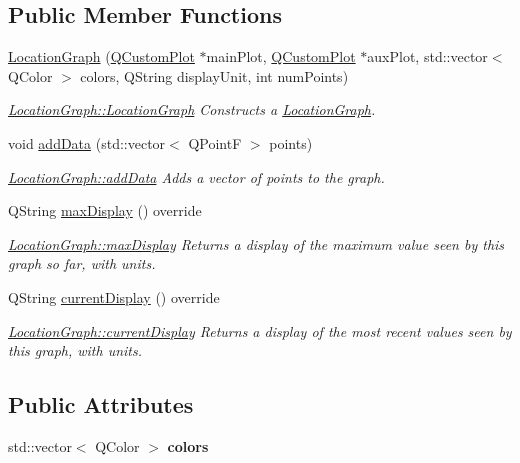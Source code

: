 \subsection*{Public Member Functions}
\begin{DoxyCompactItemize}
\item 
\hyperlink{class_location_graph_aabdd9cf30c4ff8bc2e522aab71f4f094}{Location\+Graph} (\hyperlink{class_q_custom_plot}{Q\+Custom\+Plot} $\ast$main\+Plot, \hyperlink{class_q_custom_plot}{Q\+Custom\+Plot} $\ast$aux\+Plot, std\+::vector$<$ Q\+Color $>$ colors, Q\+String display\+Unit, int num\+Points)
\begin{DoxyCompactList}\small\item\em \hyperlink{class_location_graph_aabdd9cf30c4ff8bc2e522aab71f4f094}{Location\+Graph\+::\+Location\+Graph} Constructs a \hyperlink{class_location_graph}{Location\+Graph}. \end{DoxyCompactList}\item 
void \hyperlink{class_location_graph_a7cfae63bd0a39bb8f6953053d11d7794}{add\+Data} (std\+::vector$<$ Q\+PointF $>$ points)
\begin{DoxyCompactList}\small\item\em \hyperlink{class_location_graph_a7cfae63bd0a39bb8f6953053d11d7794}{Location\+Graph\+::add\+Data} Adds a vector of points to the graph. \end{DoxyCompactList}\item 
Q\+String \hyperlink{class_location_graph_a8ac355338680e55af26cb3e74b76d278}{max\+Display} () override
\begin{DoxyCompactList}\small\item\em \hyperlink{class_location_graph_a8ac355338680e55af26cb3e74b76d278}{Location\+Graph\+::max\+Display} Returns a display of the maximum value seen by this graph so far, with units. \end{DoxyCompactList}\item 
Q\+String \hyperlink{class_location_graph_ab0f46de5c3a6b72556762bbf02d6a4b3}{current\+Display} () override
\begin{DoxyCompactList}\small\item\em \hyperlink{class_location_graph_ab0f46de5c3a6b72556762bbf02d6a4b3}{Location\+Graph\+::current\+Display} Returns a display of the most recent values seen by this graph, with units. \end{DoxyCompactList}\end{DoxyCompactItemize}
\subsection*{Public Attributes}
\begin{DoxyCompactItemize}
\item 
\hypertarget{class_location_graph_af5c037a973c98ff0a17853f8ef661c7f}{}\label{class_location_graph_af5c037a973c98ff0a17853f8ef661c7f} 
std\+::vector$<$ Q\+Color $>$ {\bfseries colors}
\end{DoxyCompactItemize}
